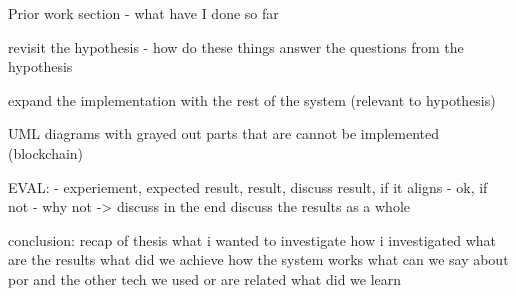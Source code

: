 Prior work section
- what have I done so far

revisit the hypothesis - how do these things answer the questions from the hypothesis

expand the implementation with the rest of the system (relevant to hypothesis)

UML diagrams with grayed out parts that are cannot be implemented (blockchain)

EVAL:
- experiement, expected result, result, discuss result, if it aligns - ok, if not - why not -> discuss
in the end discuss the results as a whole

conclusion:
recap of thesis
what i wanted to investigate
how i investigated 
what are the results
what did we achieve
how the system works 
what can we say about por and the other tech we used or are related
what did we learn
